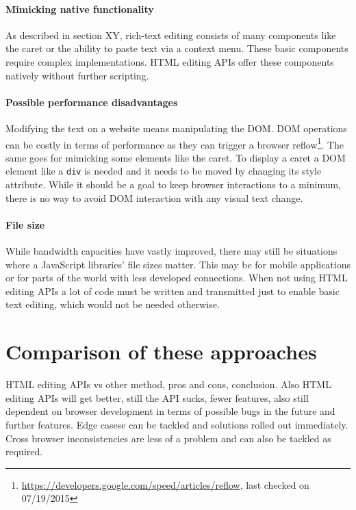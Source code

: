 

\paragraph{Mimicking native functionality} As described in section XY, rich-text editing consists of many components like the caret or the ability to paste text via a context menu. These basic components require complex implementations. HTML editing APIs offer these components natively without further scripting.

\paragraph{Possible performance disadvantages} Modifying the text on a website means manipulating the DOM. DOM operations can be costly in terms of performance as they can trigger a browser reflow\footnote{\url{https://developers.google.com/speed/articles/reflow}, last checked on 07/19/2015}. The same goes for mimicking some elements like the caret. To display a caret a DOM element like a \texttt{div} is needed and it needs to be moved by changing its style attribute. While it should be a goal to keep browser interactions to a minimum, there is no way to avoid DOM interaction with any visual text change.

\paragraph{File size} While bandwidth capacities have vastly improved, there may still be situations where a JavaScript libraries' file sizes matter. This may be for mobile applications or for parts of the world with less developed connections. When not using HTML editing APIs a lot of code must be written and transmitted just to enable basic text editing, which would not be needed otherwise.

\section{Comparison of these approaches}

HTML editing APIs vs other method, pros and cons, conclusion. Also HTML editing APIs will get better, still the API sucks, fewer features, also still dependent on browser development in terms of possible bugs in the future and further features. Edge casese can be tackled and solutions rolled out immediately. Cross browser inconsistencies are less of a problem and can also be tackled as required.